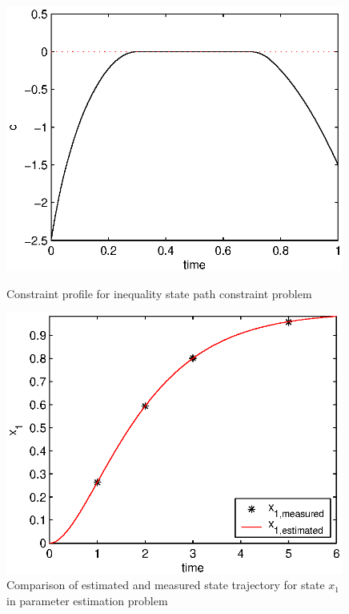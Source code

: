 \begin{figure}[htb]
\begin{minipage}[t]{0.5\linewidth}
\end{minipage}
\begin{minipage}[t]{0.5\linewidth}
\centering
\includegraphics[width=0.99\textwidth]{examples/problem3/graphs/c_627a.eps}
\caption[Tutorial example 4: constraints]{Constraint profile for
  inequality state path constraint problem} \label{fig:prob3_c}
\end{minipage}
\begin{minipage}[t]{0.5\linewidth}
\centering
\includegraphics[width=0.99\textwidth]{examples/problem8/graphs/xpa.eps}
\caption[Tutorial example 5: state profiles]{Comparison of estimated
  and measured state trajectory for state $x_{1}$ in parameter
  estimation problem} \label{fig:prob8_x} 
\end{minipage}
\end{figure}

